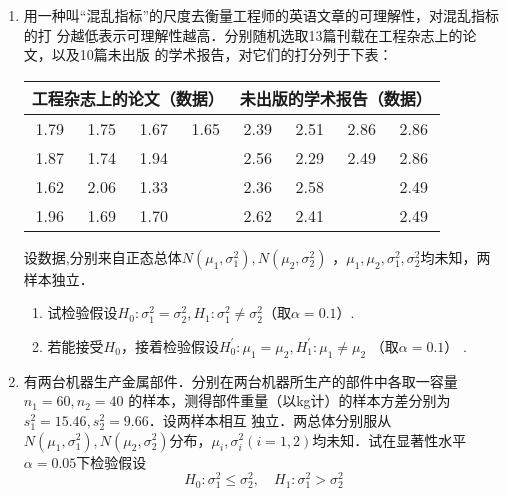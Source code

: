 \documentclass[10pt,a4paper]{article}
\begin{document}
\begin{enumerate}
    \item 用一种叫“混乱指标”的尺度去衡量工程师的英语文章的可理解性，对混乱指标的打
    分越低表示可理解性越高．分别随机选取13篇刊载在工程杂志上的论文，以及10篇未出版
    的学术报告，对它们的打分列于下表：
    \renewcommand{\arraystretch}{1.3} 
    \begin{table}[H]\centering
    \begin{tabular}{cccc|cccc}
        \hline
        \multicolumn{4}{c|}{工程杂志上的论文（数据\uppercase\expandafter{\romannumeral1}）} & \multicolumn{4}{c}{未出版的学术报告（数据\uppercase\expandafter{\romannumeral2}）}         \\ \hline
        1.79   & 1.75   & 1.67   & 1.65   & 2.39      & 2.51      & 2.86     & {\color[HTML]{FFFFFF} 2.86} \\
        1.87   & 1.74   & 1.94   &        & 2.56      & 2.29      & 2.49     & {\color[HTML]{FFFFFF} 2.86} \\
        1.62   & 2.06   & 1.33   &        & 2.36      & 2.58      &          & {\color[HTML]{FFFFFF} 2.49} \\
        1.96   & 1.69   & 1.70   &        & 2.62      & 2.41      &          & {\color[HTML]{FFFFFF} 2.49} \\ \hline
    \end{tabular}
    \end{table}
    \renewcommand{\arraystretch}{1.0} 
    设数据\uppercase\expandafter{},\uppercase\expandafter{}分别来自正态总体$N(\mu_1,\sigma_1^2),N(\mu_2,\sigma_2^2)$
    ，$\mu_1,\mu_2,\sigma_1^2,\sigma_2^2$均未知，两样本独立．
    \begin{enumerate}
        \item 试检验假设$H_0:\sigma_1^2=\sigma_2^2,H_1:\sigma_1^2\neq \sigma_2^2$（取$\alpha=0.1$）.
        \item 若能接受$H_0$，接着检验假设$H^\prime_0:\mu_1=\mu_2,H^\prime_1:\mu_1\neq \mu_2$ （取$\alpha=0.1$） .
    \end{enumerate}
    \clearpage



    \item 有两台机器生产金属部件．分别在两台机器所生产的部件中各取一容量$n_1=60,n_2=40$
    的样本，测得部件重量（以kg计）的样本方差分别为$s_1^2=15.46,s_2^2=9.66$．设两样本相互
    独立．两总体分别服从$N(\mu_1,\sigma_1^2),N(\mu_2,\sigma_2^2)$分布，$\mu_i,\sigma_i^2(i=1,2)$均未知．试在显著性水平
    $\alpha=0.05$下检验假设
    $$H_0:\sigma_1^2\leq \sigma_2^2,\quad H_1:\sigma_1^2>\sigma_2^2$$
    \clearpage




\end{enumerate}
\end{document}
